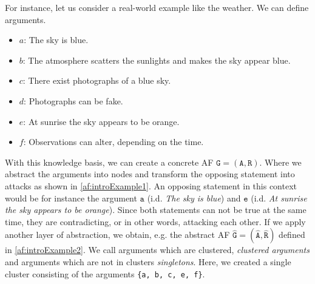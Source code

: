 For instance, let us consider a real-world example like the weather. We can define arguments.

\begin{itemize}
    \item $a$: The sky is blue.
    \item $b$: The atmosphere scatters the sunlights and makes the sky appear blue.
    \item $c$: There exist photographs of a blue sky.
    \item $d$: Photographs can be fake.
    \item $e$: At sunrise the sky appears to be orange.
    \item $f$: Observations can alter, depending on the time.
\end{itemize}

With this knowledge basis, we can create a concrete AF $\mathtt{G=(A, R)}$. Where we abstract the arguments into nodes and transform the opposing statement into attacks as shown in \cref{af:introExample1}. An opposing statement in this context would be for instance the argument $\mathtt{a}$ (i.d. \emph{The sky is blue}) and $\mathtt{e}$ (i.d. \emph{At sunrise the sky appears to be orange}). Since both statements can not be true at the same time, they are contradicting, or in other words, attacking each other. If we apply another layer of abstraction, we obtain, e.g. the abstract AF $\mathtt{\hat{G}=(\hat{A}, \hat{R})}$ defined in \cref{af:introExample2}. We call arguments which are clustered, \emph{clustered arguments} and arguments which are not in clusters \emph{singletons}. Here, we created a single cluster consisting of the arguments \texttt{\{a, b, c, e, f\}}.



\vspace{0.3cm}

